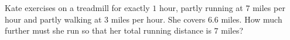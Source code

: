 Kate exercises on a treadmill for exactly $1$ hour, partly running at $7$ miles per hour and partly walking at $3$ miles per hour. She covers $6.6$ miles. How much further must she run so that her total running distance is $7$ miles?
